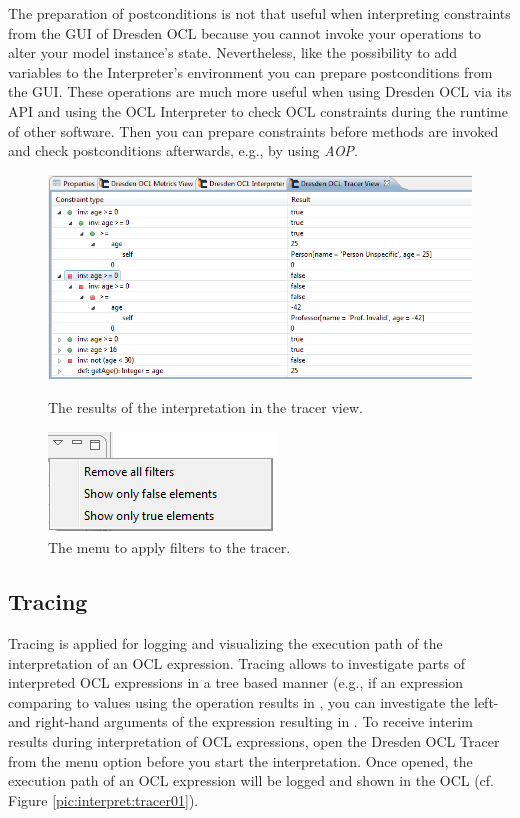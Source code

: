 The preparation of postconditions is not that useful when interpreting 
constraints from the GUI of Dresden OCL because you cannot invoke your
operations to alter your model instance's state. Nevertheless, like the
possibility to add variables to the Interpreter's environment you can prepare
postconditions from the GUI. These operations are much more useful when using
Dresden OCL via its API and using the OCL Interpreter to check OCL constraints
during the runtime of other software. Then you can prepare constraints before
methods are invoked and check postconditions afterwards, e.g., by using
\emph{\acf{AOP}}.

\begin{figure}[h]
	\centering
	\includegraphics[width=1.0\linewidth]{figures/interpreter/tracer01.png}
	\caption{The results of the interpretation in the tracer view.}
	\label{pic:interpret:tracer01}

	\vspace{3.0em}	
	
	\centering
	\includegraphics[scale=1]{figures/interpreter/tracer02.png}
	\caption{The menu to apply filters to the tracer.}
	\label{pic:interpret:tracer02}
\end{figure}

\subsection{Tracing}

Tracing is applied for logging and visualizing the execution path of the
interpretation of an \acs{OCL} expression. Tracing allows to investigate
parts of interpreted \acs{OCL} expressions in a tree based manner (e.g., if
an expression comparing to values using the \code{=} operation results in
, you can investigate the left- and right-hand arguments of the
\code{=} expression resulting in . To receive interim results
during interpretation of \acs{OCL} expressions, open the Dresden \acs{OCL}
Tracer from the menu option 
before you start the interpretation. Once opened, the execution path of an
\acs{OCL} expression will be logged and shown in the \acs{OCL}  (cf. Figure \ref{pic:interpret:tracer01}).

